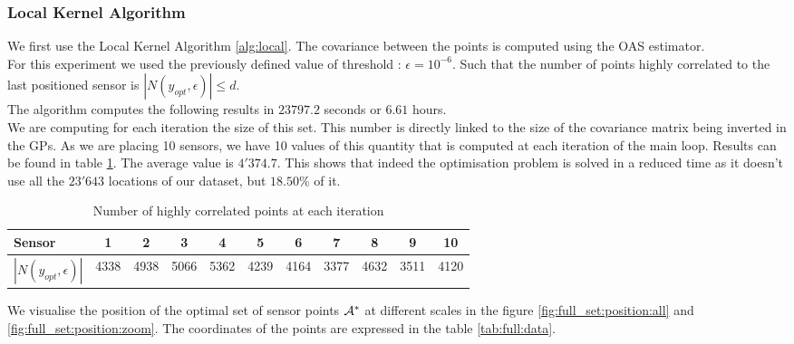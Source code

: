 \subsubsection{Local Kernel Algorithm} \label{sec:res:localK}

We first use the Local Kernel Algorithm \ref{alg:local}. The covariance between the points is computed using the OAS estimator. \\


For this experiment we used the previously defined value of threshold : $\epsilon = 10^{-6}$. Such that the number of points highly correlated to the last positioned sensor is $|N(y_{opt},\epsilon)| \leq d $. \\ 

The algorithm computes the following results in $23797.2$ seconds or $6.61$ hours. \\

We are computing for each iteration the size of this set. This number is directly linked to the size of the covariance matrix being inverted in the GPs. As we are placing 10 sensors, we have 10 values of this quantity that is computed at each iteration of the main loop. Results can be found in table \ref{tab:full:d_opt}. The average value is $4'374.7$. This shows that indeed the optimisation problem is solved in a reduced time as it doesn't use all the $23'643$ locations of our dataset, but $18.50$\% of it.   \\

\begin{table}[h]
    \centering
    \begin{tabular}{l|cccccccccc}
    \toprule
    Sensor & 1 & 2 & 3 & 4 & 5 & 6 & 7 & 8 & 9 & 10 \\     \midrule
        $|N(y_{opt},\epsilon)|$ & 4338 & 4938 & 5066 & 5362 & 4239 & 4164 & 3377 & 4632 & 3511 & 4120 \\     \bottomrule

    \end{tabular}
    \caption{Number of highly correlated points at each iteration}
    \label{tab:full:d_opt}
\end{table}


We visualise the position of the optimal set of sensor points $\mathcal{A}^*$ at different scales in the figure \ref{fig:full_set:position:all} and \ref{fig:full_set:position:zoom}. The coordinates of the points are expressed in the table \ref{tab:full:data}. \\


